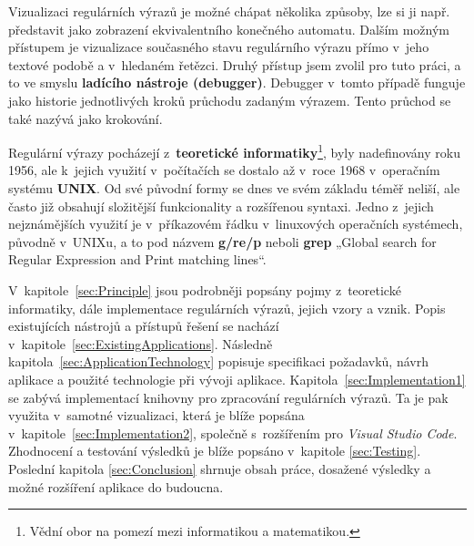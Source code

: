 Vizualizaci regulárních výrazů je možné chápat několika způsoby, lze si ji např. představit jako zobrazení ekvivalentního konečného automatu.
Dalším možným přístupem je vizualizace současného stavu regulárního výrazu přímo v~jeho textové podobě a v~hledaném řetězci. 
Druhý přístup jsem zvolil pro tuto práci, a to ve smyslu \textbf{ladícího nástroje (debugger)}. 
Debugger v~tomto případě funguje jako historie jednotlivých kroků průchodu zadaným výrazem. 
Tento průchod se také nazývá jako krokování.

Regulární výrazy pocházejí z~\textbf{teoretické informatiky}\footnote{Vědní obor na pomezí mezi informatikou a matematikou.}, byly nadefinovány roku 1956, ale k~jejich využití v~počítačích se dostalo až v~roce 1968 v~operačním systému \textbf{UNIX}.
Od své původní formy se dnes ve svém základu téměř neliší, ale často již obsahují složitější funkcionality a rozšířenou syntaxi.
Jedno z~jejich nejznámějších využití je v~příkazovém řádku v~linuxových operačních systémech, původně v~UNIXu, a to pod názvem \textbf{g/re/p} neboli \textbf{grep} 
„Global search for Regular Expression and Print matching lines“\cite{Aho_Ullman_1992}. 

V~kapitole~\ref{sec:Principle} jsou podrobněji popsány pojmy z~teoretické informatiky, dále implementace regulárních výrazů, jejich vzory a vznik.
Popis existujících nástrojů a přístupů řešení se nachází v~kapitole~\ref{sec:ExistingApplications}.
Následně kapitola~\ref{sec:ApplicationTechnology} popisuje specifikaci požadavků, návrh aplikace a použité technologie při vývoji aplikace.
Kapitola~\ref{sec:Implementation1} se zabývá implementací knihovny pro zpracování regulárních výrazů. 
Ta je pak využita v~samotné vizualizaci, která je blíže popsána v~kapitole~\ref{sec:Implementation2}, společně s~rozšířením pro \textit{Visual Studio Code}.
Zhodnocení a testování výsledků je blíže popsáno v~kapitole \ref{sec:Testing}.
Poslední kapitola \ref{sec:Conclusion} shrnuje obsah práce, dosažené výsledky a možné rozšíření aplikace do budoucna. 

\endinput